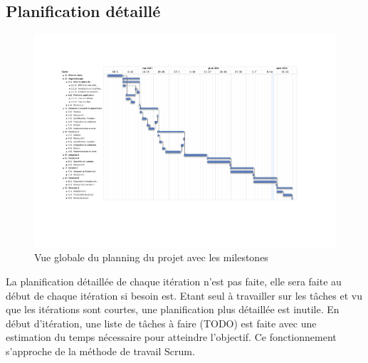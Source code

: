 	 \begin{landscape}
	 	 \subsection{Planification détaillé}
		 \begin{figure}[H]
			 \begin{center}	
				 \includegraphics[height=0.8\textwidth]{../comon/figures/planningV3.pdf}
				 \end{center}			
				 \caption{Vue globale du planning du projet avec les milestones}			
				 \label{planV1}			
		 \end{figure}	
	 \end{landscape}
	 La planification détaillée de chaque itération n'est pas  faite, elle sera faite au début de chaque itération si besoin est. Etant seul à travailler sur les tâches et vu que les itérations sont courtes, une planification plus détaillée est inutile. En début d'itération, une liste de tâches à faire (TODO) est faite avec une estimation du temps nécessaire pour atteindre l'objectif. Ce fonctionnement s'approche de la méthode de travail Scrum.
	  
